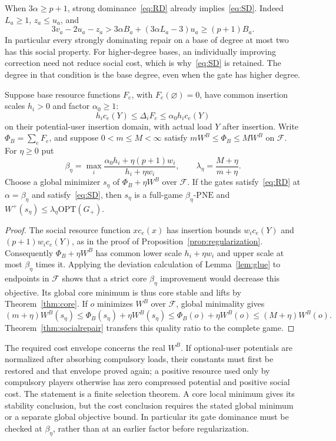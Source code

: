 \documentclass[manuscript,review,anonymous]{acmart}
\newcommand{\PNE}{\mathrm{PNE}}
\newcommand{\OPT}{\mathrm{OPT}}
\newcommand{\F}{\mathcal F}
\begin{document}
When $3\alpha\ge p+1$, strong dominance~\eqref{eq:RD} already implies~\eqref{eq:SD}. Indeed $L_a\ge1$, $z_a\le u_a$, and
\[
 3v_a-2u_a-z_a>
 3\alpha B_a+(3\alpha L_a-3)u_a\ge(p+1)B_a.
\]
In particular every strongly dominating repair on a base of degree at most two has this social property. For higher-degree bases, an individually improving correction need not reduce social cost, which is why~\eqref{eq:SD} is retained. The degree in that condition is the base degree, even when the gate has higher degree.

\begin{corollary}\label{cor:jointselection}
Suppose base resource functions $F_e$, with $F_e(\varnothing)=0$, have common insertion scales $h_i>0$ and factor $\alpha_0\ge1$:
\[
 h_ic_e(Y)\le\Delta_iF_e\le\alpha_0h_ic_e(Y)
\]
on their potential-user insertion domain, with actual load $Y$ after insertion. Write $\Phi_B=\sum_eF_e$, and suppose $0<m\le M<\infty$ satisfy $mW^B\le\Phi_B\le MW^B$ on $\F$. For $\eta\ge0$ put
\[
 \beta_\eta=\max_i\frac{\alpha_0h_i+\eta(p+1)w_i}{h_i+\eta w_i},\qquad
 \lambda_\eta=\frac{M+\eta}{m+\eta}.
\]
Choose a global minimizer $s_\eta$ of $\Phi_B+\eta W^B$ over $\F$. If the gates satisfy~\eqref{eq:RD} at $\alpha=\beta_\eta$ and satisfy~\eqref{eq:SD}, then $s_\eta$ is a full-game $\beta_\eta$-$\PNE$ and $W^+(s_\eta)\le\lambda_\eta\OPT(G_+)$.
\end{corollary}
\begin{proof}
The social resource function $xc_e(x)$ has insertion bounds $w_ic_e(Y)$ and $(p+1)w_ic_e(Y)$, as in the proof of Proposition~\ref{prop:regularization}. Consequently $\Phi_B+\eta W^B$ has common lower scale $h_i+\eta w_i$ and upper scale at most $\beta_\eta$ times it. Applying the deviation calculation of Lemma~\ref{lem:glue} to endpoints in $\F$ shows that a strict core $\beta_\eta$ improvement would decrease this objective. Its global core minimum is thus core stable and lifts by Theorem~\ref{thm:core}. If $o$ minimizes $W^B$ over $\F$, global minimality gives
\[
 (m+\eta)W^B(s_\eta)\le\Phi_B(s_\eta)+\eta W^B(s_\eta)
 \le\Phi_B(o)+\eta W^B(o)\le(M+\eta)W^B(o).
\]
Theorem~\ref{thm:socialrepair} transfers this quality ratio to the complete game.
\end{proof}
The required cost envelope concerns the real $W^B$. If optional-user potentials are normalized after absorbing compulsory loads, their constants must first be restored and that envelope proved again; a positive resource used only by compulsory players otherwise has zero compressed potential and positive social cost. The statement is a finite selection theorem. A core local minimum gives its stability conclusion, but the cost conclusion requires the stated global minimum or a separate global objective bound. In particular its gate dominance must be checked at $\beta_\eta$, rather than at an earlier factor before regularization.
\end{document}
